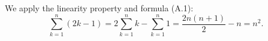 \exercise
We apply the linearity property and formula (A.1):
\[
    \sum_{k=1}^n(2k-1) = 2\sum_{k=1}^n k - \sum_{k=1}^n 1 = \frac{2n(n+1)}{2} - n = n^2.
\]
